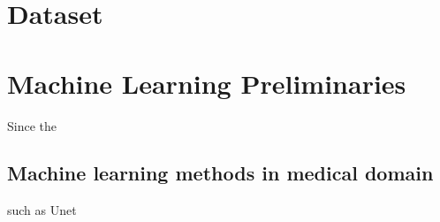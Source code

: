 \section{Dataset}
\section{Machine Learning Preliminaries}
Since the 
\subsection{Machine learning methods in medical domain}
such as Unet